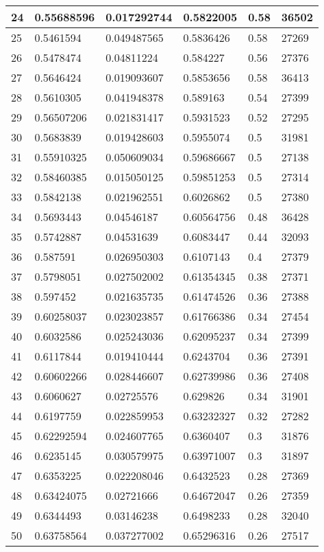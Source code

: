 \begin{longtable}{|l|l|l|l|l|l|}
24 & 0.55688596 & 0.017292744 & 0.5822005 & 0.58 & 36502 \\ \hline 
25 & 0.5461594 & 0.049487565 & 0.5836426 & 0.58 & 27269 \\ \hline 
26 & 0.5478474 & 0.04811224 & 0.584227 & 0.56 & 27376 \\ \hline 
27 & 0.5646424 & 0.019093607 & 0.5853656 & 0.58 & 36413 \\ \hline 
28 & 0.5610305 & 0.041948378 & 0.589163 & 0.54 & 27399 \\ \hline 
29 & 0.56507206 & 0.021831417 & 0.5931523 & 0.52 & 27295 \\ \hline 
30 & 0.5683839 & 0.019428603 & 0.5955074 & 0.5 & 31981 \\ \hline 
31 & 0.55910325 & 0.050609034 & 0.59686667 & 0.5 & 27138 \\ \hline 
32 & 0.58460385 & 0.015050125 & 0.59851253 & 0.5 & 27314 \\ \hline 
33 & 0.5842138 & 0.021962551 & 0.6026862 & 0.5 & 27380 \\ \hline 
34 & 0.5693443 & 0.04546187 & 0.60564756 & 0.48 & 36428 \\ \hline 
35 & 0.5742887 & 0.04531639 & 0.6083447 & 0.44 & 32093 \\ \hline 
36 & 0.587591 & 0.026950303 & 0.6107143 & 0.4 & 27379 \\ \hline 
37 & 0.5798051 & 0.027502002 & 0.61354345 & 0.38 & 27371 \\ \hline 
38 & 0.597452 & 0.021635735 & 0.61474526 & 0.36 & 27388 \\ \hline 
39 & 0.60258037 & 0.023023857 & 0.61766386 & 0.34 & 27454 \\ \hline 
40 & 0.6032586 & 0.025243036 & 0.62095237 & 0.34 & 27399 \\ \hline 
41 & 0.6117844 & 0.019410444 & 0.6243704 & 0.36 & 27391 \\ \hline 
42 & 0.60602266 & 0.028446607 & 0.62739986 & 0.36 & 27408 \\ \hline 
43 & 0.6060627 & 0.02725576 & 0.629826 & 0.34 & 31901 \\ \hline 
44 & 0.6197759 & 0.022859953 & 0.63232327 & 0.32 & 27282 \\ \hline 
45 & 0.62292594 & 0.024607765 & 0.6360407 & 0.3 & 31876 \\ \hline 
46 & 0.6235145 & 0.030579975 & 0.63971007 & 0.3 & 31897 \\ \hline 
47 & 0.6353225 & 0.022208046 & 0.6432523 & 0.28 & 27369 \\ \hline 
48 & 0.63424075 & 0.02721666 & 0.64672047 & 0.26 & 27359 \\ \hline 
49 & 0.6344493 & 0.03146238 & 0.6498233 & 0.28 & 32040 \\ \hline 
50 & 0.63758564 & 0.037277002 & 0.65296316 & 0.26 & 27517 \\ \hline 
\end{longtable}